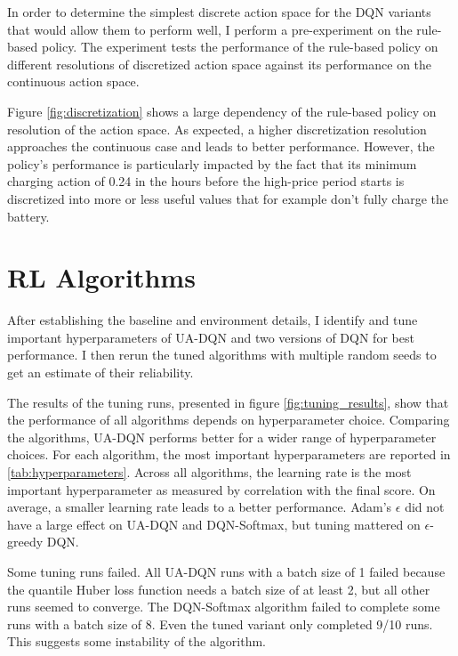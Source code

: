 In order to determine the simplest discrete action space for the DQN variants that would allow them to perform well, I perform a pre-experiment on the rule-based policy.
The experiment tests the performance of the rule-based policy on different resolutions of discretized action space against its performance on the continuous action space.

Figure \ref{fig:discretization} shows a large dependency of the rule-based policy on resolution of the action space.
As expected, a higher discretization resolution approaches the continuous case and leads to better performance.
However, the policy's performance is particularly impacted by the fact that its minimum charging action of 0.24 in the hours before the high-price period starts is discretized into more or less useful values that for example don't fully charge the battery.


\section{RL Algorithms}
After establishing the baseline and environment details, I identify and tune important hyperparameters of UA-DQN and two versions of DQN for best performance.
I then rerun the tuned algorithms with multiple random seeds to get an estimate of their reliability.

The results of the tuning runs, presented in figure \ref{fig:tuning_results}, show that the performance of all algorithms depends on hyperparameter choice.
Comparing the algorithms, UA-DQN performs better for a wider range of hyperparameter choices.
For each algorithm, the most important hyperparameters are reported in \ref{tab:hyperparameters}. Across all algorithms, the learning rate is the most important hyperparameter as measured by correlation with the final score.
On average, a smaller learning rate leads to a better performance.
Adam's $\epsilon$ did not have a large effect on UA-DQN and DQN-Softmax, but tuning mattered on $\epsilon$-greedy DQN.

Some tuning runs failed. All UA-DQN runs with a batch size of 1 failed because the quantile Huber loss function needs a batch size of at least 2, but all other runs seemed to converge.
The DQN-Softmax algorithm failed to complete some runs with a batch size of 8. Even the tuned variant only completed 9/10 runs. This suggests some instability of the algorithm.

